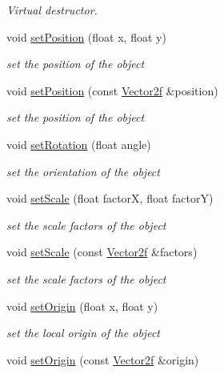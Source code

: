 \begin{DoxyCompactItemize}
\begin{DoxyCompactList}\small\item\em Virtual destructor. \end{DoxyCompactList}\item 
void \hyperlink{classsf_1_1Transformable_a4dbfb1a7c80688b0b4c477d706550208}{set\-Position} (float x, float y)
\begin{DoxyCompactList}\small\item\em set the position of the object \end{DoxyCompactList}\item 
void \hyperlink{classsf_1_1Transformable_af1a42209ce2b5d3f07b00f917bcd8015}{set\-Position} (const \hyperlink{classsf_1_1Vector2}{Vector2f} \&position)
\begin{DoxyCompactList}\small\item\em set the position of the object \end{DoxyCompactList}\item 
void \hyperlink{classsf_1_1Transformable_a32baf2bf1a74699b03bf8c95030a38ed}{set\-Rotation} (float angle)
\begin{DoxyCompactList}\small\item\em set the orientation of the object \end{DoxyCompactList}\item 
void \hyperlink{classsf_1_1Transformable_aaec50b46b3f41b054763304d1e727471}{set\-Scale} (float factor\-X, float factor\-Y)
\begin{DoxyCompactList}\small\item\em set the scale factors of the object \end{DoxyCompactList}\item 
void \hyperlink{classsf_1_1Transformable_a4c48a87f1626047e448f9c1a68ff167e}{set\-Scale} (const \hyperlink{classsf_1_1Vector2}{Vector2f} \&factors)
\begin{DoxyCompactList}\small\item\em set the scale factors of the object \end{DoxyCompactList}\item 
void \hyperlink{classsf_1_1Transformable_a56c67bd80aae8418d13fb96c034d25ec}{set\-Origin} (float x, float y)
\begin{DoxyCompactList}\small\item\em set the local origin of the object \end{DoxyCompactList}\item 
void \hyperlink{classsf_1_1Transformable_aa93a835ffbf3bee2098dfbbc695a7f05}{set\-Origin} (const \hyperlink{classsf_1_1Vector2}{Vector2f} \&origin)

\end{DoxyCompactItemize}
